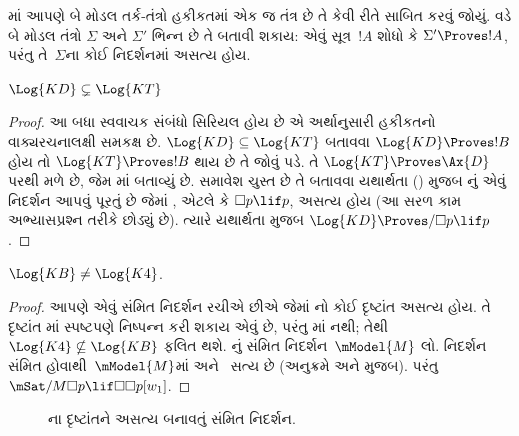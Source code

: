 \begingroup
\makeatletter{}\makeatother


\label{guunit:OLP-0437}


માં આપણે બે મોડલ તર્ક-તંત્રો હકીકતમાં એક જ તંત્ર છે તે
કેવી રીતે સાબિત કરવું જોયું.  વડે બે મોડલ
તંત્રો $\Sigma$ અને $\Sigma'$ ભિન્ન છે તે બતાવી શકાય: એવું
સૂત્ર~$!A$ શોધો કે $\Sigma' \Proves !A$, પરંતુ તે~$\Sigma$ના
કોઈ નિદર્શનમાં અસત્ય હોય.

\begin{prop}
  $\Log{KD} \subsetneq \Log{KT}$
\end{prop}

\begin{proof} આ બધા સ્વવાચક સંબંધો સિરિયલ હોય છે એ અર્થાનુસારી હકીકતનો
  વાક્યરચનાલક્ષી સમકક્ષ છે. $\Log{KD} \subseteq
  \Log{KT}$ બતાવવા $\Log{KD} \Proves !B$ હોય તો
  $\Log{KT} \Proves !B$ થાય છે તે જોવું પડે. તે $\Log{KT} \Proves
  \Ax{D}$ પરથી મળે છે, જેમ
  માં બતાવ્યું છે.
  સમાવેશ ચુસ્ત છે તે બતાવવા યથાર્થતા
  () મુજબ નું એવું નિદર્શન આપવું પૂરતું
  છે જેમાં , એટલે કે $\Box p \lif p$, અસત્ય હોય (આ સરળ કામ
  અભ્યાસપ્રશ્ન તરીકે છોડ્યું છે). ત્યારે યથાર્થતા મુજબ $\Log{KD}
  \Proves/ \Box p \lif p$.
\end{proof}

\begin{prop}
  $\Log{KB} \neq \Log{K4}$. 
\end{prop}

\begin{proof}
  આપણે એવું સંમિત નિદર્શન રચીએ છીએ જેમાં નો કોઈ દૃષ્ટાંત અસત્ય
  હોય. તે દૃષ્ટાંત માં સ્પષ્ટપણે નિષ્પન્ન કરી શકાય એવું છે, પરંતુ
  માં નથી; તેથી $\Log{K4} \nsubseteq \Log{KB}$ ફલિત થશે.
  નું સંમિત નિદર્શન~$\mModel{M}$ લો. નિદર્શન સંમિત
  હોવાથી~$\mModel{M}$માં  અને~ સત્ય છે
  (અનુક્રમે  અને
   મુજબ). પરંતુ
  $\mSat/{M}{\Box p \lif \Box\Box p}[w_1]$.
\end{proof}

\begin{figure}[htpb]
  \centering
  \caption{ના દૃષ્ટાંતને અસત્ય બનાવતું સંમિત નિદર્શન.}
\end{figure}
 
